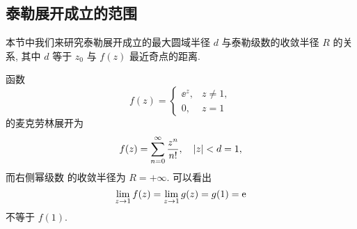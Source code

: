 \subsection{泰勒展开成立的范围\optional}
\label{ssec:taylor-expansion-radius}

本节中我们来研究泰勒展开成立的最大圆域半径 $d$ 与泰勒级数的收敛半径 $R$ 的关系, 其中 $d$ 等于 $z_0$ 与 $f(z)$ 最近奇点的距离.

\begin{example}
  函数
  \[
    f(z)=\begin{cases}
      \ee^z,&z\neq 1,\\
      0,&z=1
    \end{cases}
  \]
  的麦克劳林展开为
  \[
    f(z)=\displaystyle\sum_{n=0}^{\infty} \dfrac{z^n}{n!},\quad \lvert z\rvert<d=1,
  \]
  而右侧幂级数%
  的收敛半径为 $R=+\infty$.
  可以看出
  \[
    \lim_{z\rightarrow 1} f(z)=\lim_{z\rightarrow 1}g(z)=g(1)=\mathrm{e}
  \]
  不等于 $f(1)$.
\end{example}

